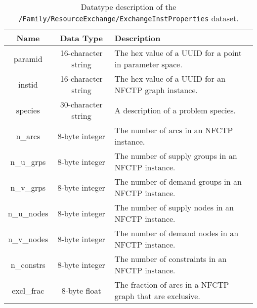 \begin{table}[h!]
\centering
\caption{\label{tbl:/Family/ResourceExchange/ExchangeInstProperties}
Datatype description of the \lstinline[basicstyle=\ttfamily\color{black}]|/Family/ResourceExchange/ExchangeInstProperties| dataset.}
\begin{tabularx}{\columnwidth-10pt}{|c|c|X|} %
\hline
\textbf{Name} & \textbf{Data Type} & \textbf{Description}       \\ \hline
paramid & 16-character string & The hex value of a UUID for a point in parameter space. \\ \hline
instid & 16-character string & The hex value of a UUID for an NFCTP graph instance. \\ \hline
species & 30-character string & A description of a problem species. \\ \hline
n\_arcs & 8-byte integer & The number of arcs in an NFCTP instance. \\ \hline
n\_u\_grps & 8-byte integer & The number of supply groups in an NFCTP instance. \\ \hline
n\_v\_grps & 8-byte integer & The number of demand groups in an NFCTP instance. \\ \hline
n\_u\_nodes & 8-byte integer & The number of supply nodes in an NFCTP instance. \\ \hline
n\_v\_nodes & 8-byte integer & The number of demand nodes in an NFCTP instance. \\ \hline
n\_constrs & 8-byte integer & The number of constraints in an NFCTP instance. \\ \hline
excl\_frac & 8-byte float & The fraction of arcs in a NFCTP graph that are exclusive. \\ \hline
\end{tabularx}
\end{table}

